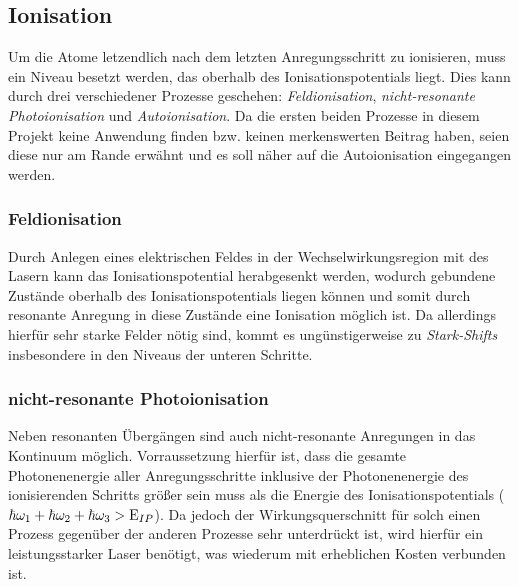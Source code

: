 \subsection{Ionisation}\label{subsec:ionisation}
Um die Atome letzendlich nach dem letzten Anregungsschritt zu ionisieren, muss
ein Niveau besetzt werden, das oberhalb des Ionisationspotentials liegt. Dies
kann durch drei verschiedener Prozesse geschehen: \textit{Feldionisation},
\textit{nicht-resonante Photoionisation} und \textit{Autoionisation}. Da die
ersten beiden Prozesse in diesem Projekt keine Anwendung finden bzw.
keinen merkenswerten Beitrag haben, seien diese nur am Rande erwähnt und es soll
näher auf die Autoionisation eingegangen werden.

\subsubsection{Feldionisation}\label{subsubsec:feldionisation}
Durch Anlegen eines elektrischen Feldes in der Wechselwirkungsregion mit des
Lasern kann das Ionisationspotential herabgesenkt werden, wodurch gebundene
Zustände oberhalb des Ionisationspotentials liegen können und somit durch
resonante Anregung in diese Zustände eine Ionisation möglich ist. Da allerdings
hierfür sehr starke Felder nötig sind, kommt es ungünstigerweise zu
\textit{Stark-Shifts} insbesondere in den Niveaus der unteren Schritte.

\subsubsection{nicht-resonante
Photoionisation}\label{subsubsec:nicht-resonante_photoionisation}
Neben resonanten Übergängen sind auch nicht-resonante Anregungen in das
Kontinuum möglich. Vorraussetzung hierfür ist, dass die gesamte Photonenenergie
aller Anregungsschritte inklusive der Photonenenergie des ionisierenden Schritts
größer sein muss als die Energie des Ionisationspotentials
($\hbar\omega_1+\hbar\omega_2+\hbar\omega_3>\operatorname{E}_{IP}$). Da jedoch der
Wirkungsquerschnitt für solch einen Prozess gegenüber der anderen Prozesse
sehr unterdrückt ist, wird hierfür ein leistungsstarker Laser
benötigt, was wiederum mit erheblichen Kosten verbunden ist.

